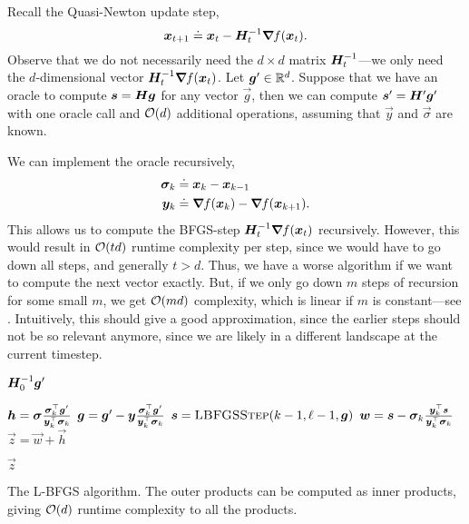 Recall the Quasi-Newton update step, \[
    \bm{x}_{t+1} \doteq \bm{x}_t - \bm{H}^{-1}_t \bm{\nabla}_{\! } f(\bm{x}_t).
\]
Observe that we do not necessarily need the $d \times d$ matrix $\bm{H}^{-1}_t$---we only need
the $d$-dimensional vector $\bm{H}^{-1}_t \bm{\nabla}_{\! } f(\bm{x}_t)$. Let $\bm{g}' \in \mathbb{R}^d$.
Suppose that we have an oracle to compute $\bm{s} = \bm{H} \bm{g}$ for any vector $\vec{g}$,
then we can compute $\bm{s}' = \bm{H}' \bm{g}'$ with one oracle call and $\bigo{d}$ additional
operations, assuming that $\vec{y}$ and $\vec{\sigma}$ are known.

We can implement the oracle recursively,
\begin{align*}
    \bm{\sigma}_k & \doteq \bm{x}_k - \bm{x}_{k-1}                          \\
    \bm{y}_k      & \doteq \bm{\nabla}_{\! } f(\bm{x}_k) - \bm{\nabla}_{\! } f(\bm{x}_{k+1}).
\end{align*}
This allows us to compute the BFGS-step $\bm{H}^{-1}_t \bm{\nabla}_{\! } f(\bm{x}_t)$ recursively. However,
this would result in $\bigo{td}$ runtime complexity per step, since we would have to go down all
steps, and generally $t > d$. Thus, we have a worse algorithm if we want to compute the next vector
exactly. But, if we only go down $m$ steps of recursion for some small $m$, we get $\bigo{md}$
complexity, which is linear if $m$ is constant---see . Intuitively, this should give
a good approximation, since the earlier steps should not be so relevant anymore, since we are likely
in a different landscape at the current timestep.

\begin{algorithm}
    \begin{algorithmic}
        \State \Return $\bm{H}^{-1}_0 \bm{g}'$
        \EndIf

        \State $\bm{h} = \bm{\sigma} \frac{\bm{\sigma}_k^\top \bm{g}'}{\bm{y}_k^\top \bm{\sigma}_k}$
        \State $\bm{g} = \bm{g}' - \bm{y} \frac{\bm{\sigma}_k^\top \bm{g}'}{\bm{y}_k^\top \bm{\sigma}_k}$
        \State $\vec{s} = \Call{LBFGSStep}{k-1, \ell - 1, \vec{g}}$
        \State $\bm{w} = \bm{s} - \bm{\sigma}_k \frac{\bm{y}_k^\top \bm{s}}{\bm{y}_k^\top \bm{\sigma}_k}$
        \State $\vec{z} = \vec{w} + \vec{h}$

        \State \Return $\vec{z}$
        \EndFunction
    \end{algorithmic}
    \caption{The L-BFGS algorithm. The outer products can be computed as inner products, giving $\bigo{d}$ runtime complexity to all the products.}
    \label{alg:l-bfgs}
\end{algorithm}

